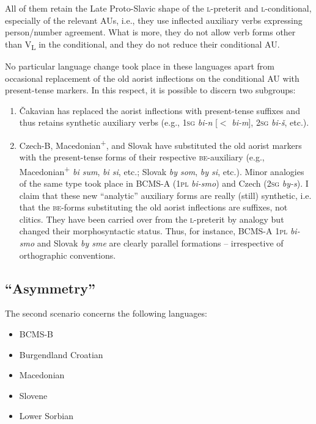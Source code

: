 \documentclass[output=paper]{langscibook}
\begin{document}
\noindent All of them retain the Late Proto-Slavic shape of the \textsc{l-}preterit and \textsc{l-}conditional, especially of the relevant AUs, i.e., they use inflected auxiliary verbs expressing person/number agreement. What is more, they do not allow verb forms other than V\textsubscript{L} in the conditional, and they do not reduce their conditional AU.

No particular language change took place in these languages apart from occasional replacement of the old aorist inflections on the conditional AU with present-tense markers. In this respect, it is possible to discern two subgroups: 

\begin{enumerate}
\item Čakavian has replaced the aorist inflections with present-tense suffixes and thus retains synthetic auxiliary verbs (e.g., \textsc{1sg} \textit{bi-n} [$<$ \textit{bi-m}], \textsc{2sg} \textit{bi-š}, etc.). 
\item Czech-B, Macedonian\textsuperscript{+}, and Slovak have substituted the old aorist markers with the present-tense forms of their respective \textsc{be}-auxiliary (e.g., Mace\-donian\textsuperscript{+} \textit{bi sum}, \textit{bi si}, etc.; Slovak \textit{by som}, \textit{by si}, etc.). Minor analogies of the same type took place in BCMS-A (\textsc{1pl} \textit{bi-smo}) and Czech (\textsc{2sg} \textit{by-s}). I claim that these new ``analytic'' auxiliary forms are really (still) synthetic, i.e. that the \textsc{be}-forms substituting the old aorist inflections are suffixes, not clitics. They have been carried over from the \textsc{l-}preterit by analogy but changed their morphosyntactic status. Thus, for instance, BCMS-A \textsc{1pl} \textit{bi-smo} and Slovak \textit{by sme} are clearly parallel formations -- irrespective of orthographic conventions.
\end{enumerate}


\subsection{``Asymmetry''}\label{pitsch:sec:asymmetry}

The second scenario concerns the following languages:

\begin{itemize}
    \item BCMS-B
    \item Burgendland Croatian
    \item Macedonian
    \item Slovene
    \item Lower Sorbian
\end{itemize}
\end{document}
